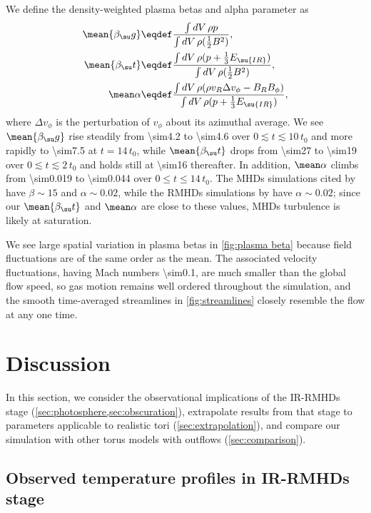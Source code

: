\documentclass[twocolumn]{article}
\newcommand*\irrmhd{\ac{IR}\protect\nobreakdash-\acp{RMHD}}
\newcommand*\titleirrmhd{\texorpdfstring
  {\acs*{IR}\protect\nobreakdash-\acsp*{RMHD}}{IR-RMHD}}
\begin{document}
We define the density-weighted plasma betas and alpha parameter as
\begin{align}
\mean{\beta_\su g} &\eqdef \frac{\int dV\,\rho p}
  {\int dV\,\rho (\tfrac12B^2)}, \\
\mean{\beta_\su t} &\eqdef \frac{\int dV\,\rho (p+\tfrac13E_\su{IR})}
  {\int dV\,\rho (\tfrac12B^2)}, \\
\mean\alpha &\eqdef \frac{\int dV\,\rho (\rho v_R\Delta v_\phi-B_RB_\phi)}
  {\int dV\,\rho (p+\tfrac13E_\su{IR})},
\end{align}
where $\Delta v_\phi$ is the perturbation of $v_\phi$ about its azimuthal
average. We see $\mean{\beta_\su g}$ rise steadily from \num{\sim4.2} to
\num{\sim4.6} over $0\lesssim t\lesssim10\,t_0$ and more rapidly to
\num{\sim7.5} at $t=14\,t_0$, while $\mean{\beta_\su t}$ drops from
\num{\sim27} to \num{\sim19} over $0\lesssim t\lesssim2\,t_0$ and holds still
at \num{\sim16} thereafter. In addition, $\mean\alpha$ climbs from
\num{\sim0.019} to \num{\sim0.044} over $0\le t\le14\,t_0$. The \acp{MHD}
simulations cited by \citet{2011ApJ...738...84H} have $\beta\sim15$ and
$\alpha\sim0.02$, while the \acp{RMHD} simulations by
\citet{2009ApJ...691...16H} have $\alpha\sim0.02$; since our $\mean{\beta_\su
t}$ and $\mean\alpha$ are close to these values, \acp{MHD} turbulence is likely
at saturation.

We see large spatial variation in plasma betas in \cref{fig:plasma beta}
because field fluctuations are of the same order as the mean. The associated
velocity fluctuations, having Mach numbers \num{\sim0.1}, are much smaller than
the global flow speed, so gas motion remains well ordered throughout the
simulation, and the smooth time-averaged streamlines in \cref{fig:streamlines}
closely resemble the flow at any one time.

\section{Discussion}
\label{sec:discussion}

In this section, we consider the observational implications of the \irrmhd{}
stage (\cref{sec:photosphere,sec:obscuration}), extrapolate results from that
stage to parameters applicable to realistic tori (\cref{sec:extrapolation}),
and compare our simulation with other torus models with outflows
(\cref{sec:comparison}).

\subsection{Observed temperature profiles in \titleirrmhd{} stage}
\label{sec:photosphere}
\end{document}
